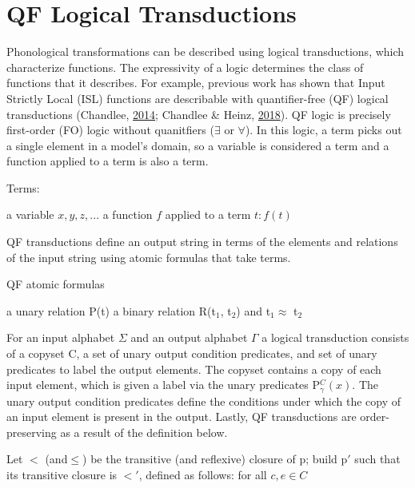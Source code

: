 \documentclass[,doc,floatsintext]{apa6}
\theoremstyle{definition}
\theoremstyle{definition}
\theoremstyle{definition}
\theoremstyle{remark}
\begin{document}
\section{QF Logical Transductions}\label{qf-logical-transductions}

Phonological transformations can be described using logical
transductions, which characterize functions. The expressivity of a logic
determines the class of functions that it describes. For example,
previous work has shown that Input Strictly Local (ISL) functions are
describable with quantifier-free (QF) logical transductions (Chandlee,
\protect\hyperlink{ref-chandlee2014}{2014}; Chandlee \& Heinz,
\protect\hyperlink{ref-chandleeheinz2018}{2018}). QF logic is precisely
first-order (FO) logic without quanitfiers (\(\exists\) or \(\forall\)).
In this logic, a term picks out a single element in a model's domain, so
a variable is considered a term and a function applied to a term is also
a term.

\begin{exe}
\ex Terms: \label{terms}
  \begin{xlist}
  \ex a variable $x, y, z, ...$
  \ex a function $f$ applied to a term $t: f(t)$
  \end{xlist}
\end{exe}

QF transductions define an output string in terms of the elements and
relations of the input string using atomic formulas that take terms.

\begin{exe}
\ex QF atomic formulas\label{atom}
  \begin{xlist}
  \ex a unary relation P(t)
  \ex a binary relation R(t$_1$, t$_2$) and
  \ex t$_1 \approx$ t$_2$
  \end{xlist}
\end{exe}

\noindent For an input alphabet \(\Sigma\) and an output alphabet
\(\Gamma\) a logical transduction consists of a copyset C, a set of
unary output condition predicates, and set of unary predicates to label
the output elements. The copyset contains a copy of each input element,
which is given a label via the unary predicates P\(^C_{\gamma}(x)\). The
unary output condition predicates define the conditions under which the
copy of an input element is present in the output. Lastly, QF
transductions are order-preserving as a result of the definition below.

\begin{exe}
\ex\label{order-pres} Let $<$ (and$\leq$) be the transitive (and reflexive) closure of p; build p$'$ such that its transitive closure is $<'$, defined as follows: for all $c, e\in C$
\end{exe}
\end{document}
